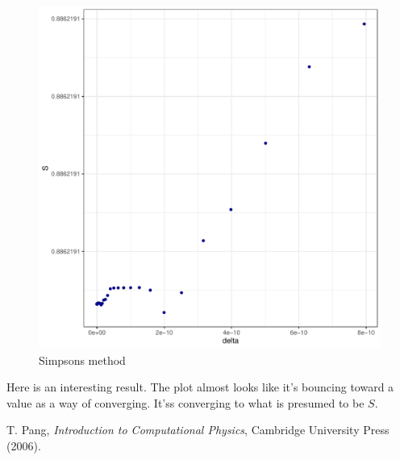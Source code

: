 \documentclass[prb,twocolumn]{revtex4-2}
\begin{document}
\begin{figure}[h!]
\centerline{\includegraphics [width=3 in] {simpsons_adapt}} \caption{Simpsons method} \label{simpsons_adapt}
\end{figure}

Here is an interesting result. The plot almost looks like it's bouncing toward a value as a way of converging. It'ss converging to what is presumed to be $S$.

\begin{thebibliography}{99}

 T. Pang, \emph{Introduction to Computational Physics}, Cambridge University Press (2006).

\end{thebibliography}
\end{document}
